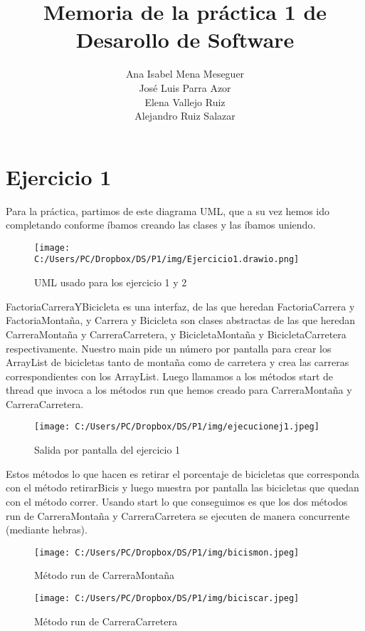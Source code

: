 \documentclass{article}
\title{Memoria de la práctica 1 de Desarollo de Software}
\author{Ana Isabel Mena Meseguer \\ José Luis Parra Azor\\ Elena Vallejo Ruiz \\ Alejandro Ruiz Salazar}
\date{}
\begin{document}
\maketitle
\section{Ejercicio 1}
Para la práctica, partimos de este diagrama UML, que a su vez hemos ido completando conforme íbamos creando las clases y las íbamos uniendo. 
\begin{figure}[H]
\centering
\texttt{[image: C:/Users/PC/Dropbox/DS/P1/img/Ejercicio1.drawio.png]}
\caption{UML usado para los ejercicio 1 y 2}
\end{figure}
FactoriaCarreraYBicicleta es una interfaz, de las que heredan FactoriaCarrera y FactoriaMontaña, y Carrera y Bicicleta son clases abstractas de las que heredan CarreraMontaña y CarreraCarretera, y BicicletaMontaña y BicicletaCarretera respectivamente. 
Nuestro main pide un número por pantalla para crear los ArrayList de bicicletas tanto de montaña como de carretera y crea las carreras correspondientes con los ArrayList. Luego llamamos a los métodos start de thread que invoca a los métodos run que hemos creado para CarreraMontaña y CarreraCarretera. 
\begin{figure}[H]
\centering
\texttt{[image: C:/Users/PC/Dropbox/DS/P1/img/ejecucionej1.jpeg]}
\caption{Salida por pantalla del ejercicio 1}
\end{figure}
Estos métodos lo que hacen es retirar el porcentaje de bicicletas que corresponda con el método retirarBicis y luego muestra por pantalla las bicicletas que quedan con el método correr. Usando start lo que conseguimos es que los dos métodos run de CarreraMontaña y CarreraCarretera se ejecuten de manera concurrente (mediante hebras).
\begin{figure}[H]
\centering
\texttt{[image: C:/Users/PC/Dropbox/DS/P1/img/bicismon.jpeg]}
\caption{Método run de CarreraMontaña}
\end{figure}
\begin{figure}[H]
\centering
\texttt{[image: C:/Users/PC/Dropbox/DS/P1/img/biciscar.jpeg]}
\caption{Método run de CarreraCarretera}
\end{figure}
\end{document}
